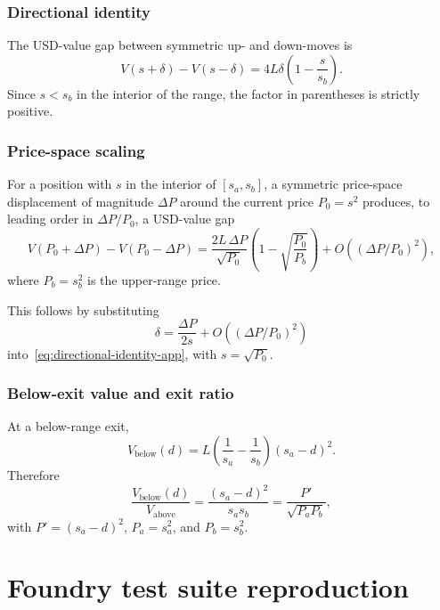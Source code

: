\documentclass{manuscript}
\begin{document}
\subsubsection*{Directional identity}

The USD-value gap between symmetric up- and down-moves is
\begin{equation}\label{eq:directional-identity-app}
V(s + \delta) - V(s - \delta)
= 4L\delta\left(1 - \frac{s}{s_b}\right).
\end{equation}
Since $s < s_b$ in the interior of the range, the factor in parentheses is strictly positive.

\subsubsection*{Price-space scaling}

\begin{corollary}\label{cor:directional-scaling}
For a position with $s$ in the interior of $[s_a, s_b]$, a symmetric price-space displacement of magnitude $\Delta P$ around the current price $P_0 = s^2$ produces, to leading order in $\Delta P/P_0$, a USD-value gap
\[
V(P_0 + \Delta P) - V(P_0 - \Delta P)
=
\frac{2L\,\Delta P}{\sqrt{P_0}}
\left(1 - \sqrt{\frac{P_0}{P_b}}\right)
+
O\!\left((\Delta P/P_0)^2\right),
\]
where $P_b = s_b^2$ is the upper-range price.
\end{corollary}

This follows by substituting
\[
\delta = \frac{\Delta P}{2s} + O\!\left((\Delta P/P_0)^2\right)
\]
into~\eqref{eq:directional-identity-app}, with $s = \sqrt{P_0}$.

\subsubsection*{Below-exit value and exit ratio}

At a below-range exit,
\begin{equation}\label{eq:vbelow-app}
V_{\text{below}}(d) = L\left(\frac{1}{s_a} - \frac{1}{s_b}\right)(s_a - d)^2.
\end{equation}
Therefore
\[
\frac{V_{\text{below}}(d)}{V_{\text{above}}}
=
\frac{(s_a - d)^2}{s_a s_b}
=
\frac{P'}{\sqrt{P_a P_b}},
\]
with $P' = (s_a-d)^2$, $P_a = s_a^2$, and $P_b = s_b^2$.

\section{Foundry test suite reproduction}\label{app:foundry}
\end{document}
